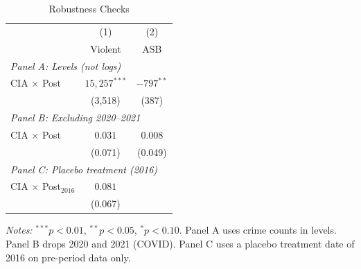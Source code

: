 \begin{table}[H]
\centering
\caption{Robustness Checks}
\label{tab:robust}
\begin{threeparttable}
\begin{tabular}{lcc}
\toprule
 & (1) & (2) \\
 & Violent & ASB \\
\midrule
\multicolumn{3}{l}{\textit{Panel A: Levels (not logs)}} \\
CIA $\times$ Post & $15,257^{***}$ & $-797^{**}$ \\
 & (3,518) & (387) \\
\midrule
\multicolumn{3}{l}{\textit{Panel B: Excluding 2020--2021}} \\
CIA $\times$ Post & $0.031$ & $0.008$ \\
 & (0.071) & (0.049) \\
\midrule
\multicolumn{3}{l}{\textit{Panel C: Placebo treatment (2016)}} \\
CIA $\times$ Post$_{2016}$ & $0.081$ & \\
 & (0.067) & \\
\bottomrule
\end{tabular}
\begin{tablenotes}[flushleft]
\footnotesize
\item \textit{Notes:} $^{***}p<0.01$, $^{**}p<0.05$, $^{*}p<0.10$. Panel A uses crime counts in levels. Panel B drops 2020 and 2021 (COVID). Panel C uses a placebo treatment date of 2016 on pre-period data only.
\end{tablenotes}
\end{threeparttable}
\end{table}
